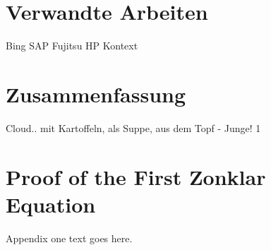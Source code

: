 \documentclass[journal]{IEEEtran}
\begin{document}


\section{Verwandte Arbeiten}
Bing
SAP
Fujitsu
HP
Kontext

\section{Zusammenfassung}
Cloud.. mit Kartoffeln, als Suppe, aus dem Topf - Junge!
1



%


\appendices
\section{Proof of the First Zonklar Equation}
Appendix one text goes here.
\end{document}
